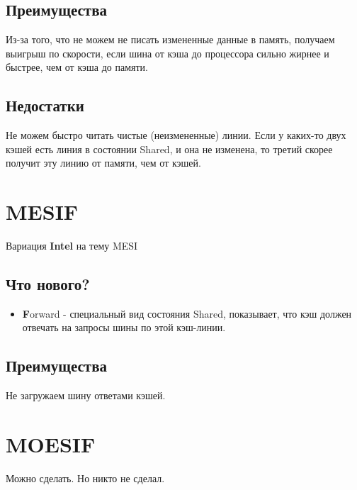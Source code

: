 \documentclass[12pt, a4paper]{article}
\begin{document}
\subsection{Преимущества}
Из-за того, что не можем не писать измененные данные в память, получаем выигрыш по скорости, если шина от кэша до процессора сильно жирнее и быстрее, чем от кэша до памяти.
\subsection{Недостатки}
Не можем быстро читать чистые (неизмененные) линии. Если у каких-то двух кэшей есть линия в состоянии Shared, и она не изменена, то третий скорее получит эту линию от памяти, чем от кэшей.
\section{MESIF}
Вариация \textbf{Intel} на тему MESI
\subsection{Что нового?}
\begin{itemize}
    \item \textbf{F}orward - специальный вид состояния Shared, показывает, что кэш должен отвечать на запросы шины по этой кэш-линии.
\end{itemize}
\subsection{Преимущества}
Не загружаем шину ответами кэшей.
\section{MOESIF}
Можно сделать. Но никто не сделал.
\end{document}
